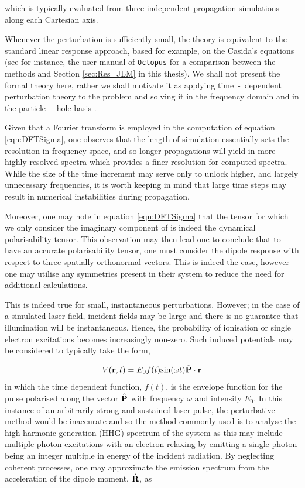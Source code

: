 which is typically evaluated from three independent propagation simulations along each Cartesian axis.

Whenever the perturbation is sufficiently small, the theory is equivalent to the standard linear response approach, based for example, on the Casida's equations \cite{Casida} (see for instance, the user manual of \texttt{Octopus} for a comparison between the methods and Section \ref{sec:Res_JLM} in this thesis). We shall not present the formal theory here, rather we shall motivate it as applying time~-~dependent perturbation theory to the problem and solving it in the frequency domain and in the particle~-~hole basis \cite{TDDFT_Fun_Book,Casida}.

Given that a Fourier transform is employed in the computation of equation \ref{eqn:DFTSigma}, one observes that the length of simulation essentially sets the resolution in frequency space, and so longer propagations will yield in more highly resolved spectra which provides a finer resolution for computed spectra. While the size of the time increment may serve only to unlock higher, and largely unnecessary frequencies, it is worth keeping in mind that large time steps may result in numerical instabilities during propagation.  

Moreover, one may note in equation \ref{eqn:DFTSigma} that the tensor for which we only consider the imaginary component of is indeed the dynamical polarisability tensor. This observation may then lead one to conclude that to have an accurate polarisability tensor, one must consider the dipole response with respect to three spatially orthonormal vectors. This is indeed the case, however one may utilise any symmetries present in their system to reduce the need for additional calculations.

This is indeed true for small, instantaneous perturbations. However; in the case of a simulated laser field, incident fields may be large and there is no guarantee that illumination will be instantaneous. Hence, the probability of ionisation or single electron excitations becomes increasingly non-zero. Such induced potentials may be considered to typically take the form,

\begin{equation}
    V(\textbf{r},t) = E_{0}f(t)\text{sin}(\omega t)\Hat{\textbf{P}}\cdot \textbf{r}
    \label{eqn:pulse}
\end{equation}
in which the time dependent function, $f(t)$, is the envelope function for the pulse polarised along the vector $\Hat{\textbf{P}}$ with frequency $\omega$ and intensity $E_{0}$. In this instance of an arbitrarily strong and sustained laser pulse, the perturbative method would be inaccurate and so the method commonly used is to analyse the high harmonic generation (HHG) spectrum of the system as this may include multiple photon excitations with an electron relaxing by emitting a single photon being an integer multiple in energy of the incident radiation. By neglecting coherent processes, one may approximate the emission spectrum from the acceleration of the dipole moment, $\Hat{\textbf{R}}$, as

